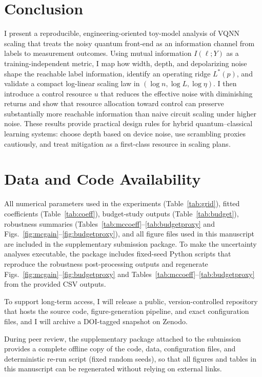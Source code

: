\documentclass[journal]{IEEEtran}
\newcommand{\MI}{I(\ell;Y)}
\begin{document}
\section{Conclusion}
I present a reproducible, engineering-oriented toy-model analysis of VQNN scaling that treats the noisy quantum front-end as an information channel from labels to measurement outcomes. Using mutual information $\MI$ as a training-independent metric, I map how width, depth, and depolarizing noise shape the reachable label information, identify an operating ridge $L^{\ast}(p)$, and validate a compact log-linear scaling law in $(\log n,\log L,\log\eta)$. I then introduce a control resource $u$ that reduces the effective noise with diminishing returns and show that resource allocation toward control can preserve substantially more reachable information than naive circuit scaling under higher noise. These results provide practical design rules for hybrid quantum--classical learning systems: choose depth based on device noise, use scrambling proxies cautiously, and treat mitigation as a first-class resource in scaling plans.

\section*{Data and Code Availability}
All numerical parameters used in the experiments (Table~\ref{tab:grid}), fitted coefficients (Table~\ref{tab:coeff}), budget-study outputs (Table~\ref{tab:budget}), robustness summaries (Tables~\ref{tab:mccoeff}--\ref{tab:budgetproxy} and Figs.~\ref{fig:mcgain}--\ref{fig:budgetproxy}), and all figure files used in this manuscript are included in the supplementary submission package. To make the uncertainty analyses executable, the package includes fixed-seed Python scripts that reproduce the robustness post-processing outputs and regenerate Figs.~\ref{fig:mcgain}--\ref{fig:budgetproxy} and Tables~\ref{tab:mccoeff}--\ref{tab:budgetproxy} from the provided CSV outputs.

To support long-term access, I will release a public, version-controlled repository that hosts the source code, figure-generation pipeline, and exact configuration files, and I will archive a DOI-tagged snapshot on Zenodo.

During peer review, the supplementary package attached to the submission provides a complete offline copy of the code, data, configuration files, and deterministic re-run script (fixed random seeds), so that all figures and tables in this manuscript can be regenerated without relying on external links.
\end{document}
